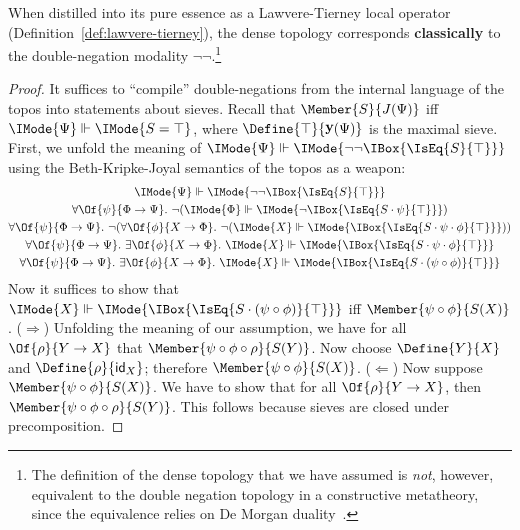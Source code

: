 \documentclass{article}
\DeclareMathOperator\OpYoneda{\mathbf{y}}
\newcommand\Yoneda[1]{\OpYoneda({#1})}
\newcommand\ArrId[1]{\mathsf{id}_{#1}}
\newcommand\Forces[2]{\IMode{#1}\Vdash\IMode{#2}}
\begin{document}
\begin{lem}
  When distilled into its pure essence as a Lawvere-Tierney local
  operator (Definition~\ref{def:lawvere-tierney}), the dense topology
  corresponds \textbf{classically} to the double-negation modality
  $\lnot\lnot$.\footnote{The definition of the dense topology that we
    have assumed is \emph{not}, however, equivalent to the double
    negation topology in a constructive metatheory, since the
    equivalence relies on De Morgan
    duality~\cite{spitters:2010,coquand:2013}.}
\end{lem}
\begin{proof}
  It suffices to ``compile'' double-negations from the internal
  language of the topos into statements about sieves. Recall that
  $\Member{S}{J(\Psi)}$ iff $\Forces{\Psi}{S=\top}$, where
  $\Define{\top}{\Yoneda{\Psi}}$ is the maximal sieve. First, we
  unfold the meaning of
  $\Forces{\Psi}{\lnot\lnot\IBox{\IsEq{S}{\top}}}$ using the
  Beth-Kripke-Joyal semantics of the topos as a weapon:
  \begin{gather}
    \Forces{\Psi}{\lnot\lnot\IBox{\IsEq{S}{\top}}}
    \\
    \forall\Of{\psi}{\Phi\to\Psi}.\
    \lnot(\Forces{\Phi}{\lnot\IBox{\IsEq{S\cdot\psi}{\top}}})
    \\
    \forall\Of{\psi}{\Phi\to\Psi}.\
    \lnot(
      \forall\Of{\phi}{X\to\Phi}.\
      \lnot(\Forces{X}{\IBox{\IsEq{S\cdot\psi\cdot\phi}{\top}}})
    )
    \label{de-morgan-1}
    \\
    \forall\Of{\psi}{\Phi\to\Psi}.\
    \exists\Of{\phi}{X\to \Phi}.\
    \Forces{X}{\IBox{\IsEq{S\cdot\psi\cdot\phi}{\top}}}
    \label{de-morgan-2}
    \\
    \forall\Of{\psi}{\Phi\to\Psi}.\
    \exists\Of{\phi}{X\to \Phi}.\
    \Forces{X}{\IBox{\IsEq{S\cdot(\psi\circ\phi)}{\top}}}
  \end{gather}
  Now it suffices to show that
  $\Forces{X}{\IBox{\IsEq{S\cdot(\psi\circ\phi)}{\top}}}$ iff
  $\Member{\psi\circ\phi}{S(X)}$.
  ($\Rightarrow$) Unfolding the meaning of our assumption, we have for
  all $\Of{\rho}{Y\to X}$ that
  $\Member{\psi\circ\phi\circ\rho}{S(Y)}$. Now choose $\Define{Y}{X}$
  and $\Define{\rho}{\ArrId{X}}$; therefore
  $\Member{\psi\circ\phi}{S(X)}$.
  ($\Leftarrow$) Now suppose $\Member{\psi\circ\phi}{S(X)}$. We have
  to show that for all $\Of{\rho}{Y\to X}$, then
  $\Member{\psi\circ\phi\circ\rho}{S(Y)}$. This follows because sieves
  are closed under precomposition.
\end{proof}
\end{document}
